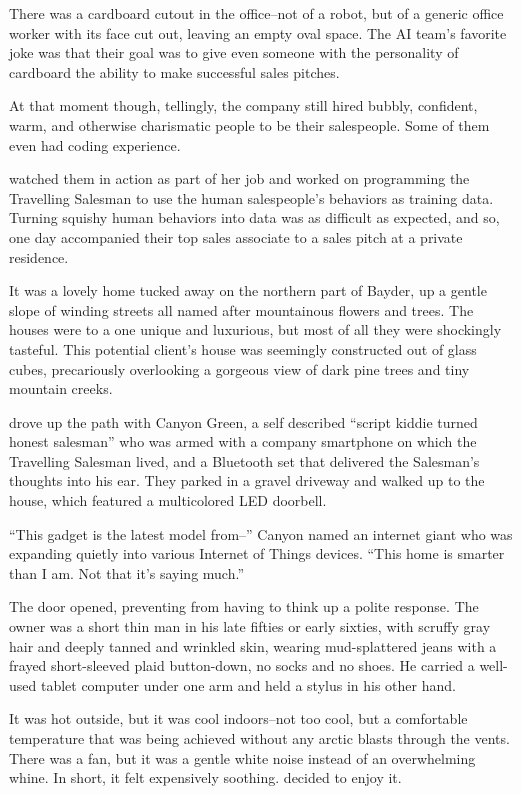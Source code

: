 There was a cardboard cutout in the office--not of a robot, but of a generic office worker with its face cut out, leaving an empty oval space. The AI team's favorite joke was that their goal was to give even someone with the personality of cardboard the ability to make successful sales pitches.

At that moment though, tellingly, the company still hired bubbly, confident, warm, and otherwise charismatic people to be their salespeople. Some of them even had coding experience.

{\protag} watched them in action as part of her job and worked on programming the Travelling Salesman to use the human salespeople’s behaviors as training data. Turning squishy human behaviors into data was as difficult as expected, and so, one day {\protag} accompanied their top sales associate to a sales pitch at a private residence.

It was a lovely home tucked away on the northern part of Bayder, up a gentle slope of winding streets all named after mountainous flowers and trees. The houses were to a one unique and luxurious, but most of all they were shockingly tasteful. This potential client's house was seemingly constructed out of glass cubes, precariously overlooking a gorgeous view of dark pine trees and tiny mountain creeks.

{\protag} drove up the path with Canyon Green, a self described ``script kiddie turned honest salesman'' who was armed with a company smartphone on which the Travelling Salesman lived, and a Bluetooth set that delivered the Salesman's thoughts into his ear. They parked in a gravel driveway and walked up to the house, which featured a multicolored LED doorbell.

``This gadget is the latest model from--'' Canyon named an internet giant who was expanding quietly into various Internet of Things devices. ``This home is smarter than I am. Not that it's saying much.''

The door opened, preventing {\protag} from having to think up a polite response. The owner was a short thin man in his late fifties or early sixties, with scruffy gray hair and deeply tanned and wrinkled skin, wearing mud-splattered jeans with a frayed short-sleeved plaid button-down, no socks and no shoes. He carried a well-used tablet computer under one arm and held a stylus in his other hand.

It was hot outside, but it was cool indoors--not too cool, but a comfortable temperature that was being achieved without any arctic blasts through the vents. There was a fan, but it was a gentle white noise instead of an overwhelming whine. In short, it felt expensively soothing. {\protag} decided to enjoy it.

